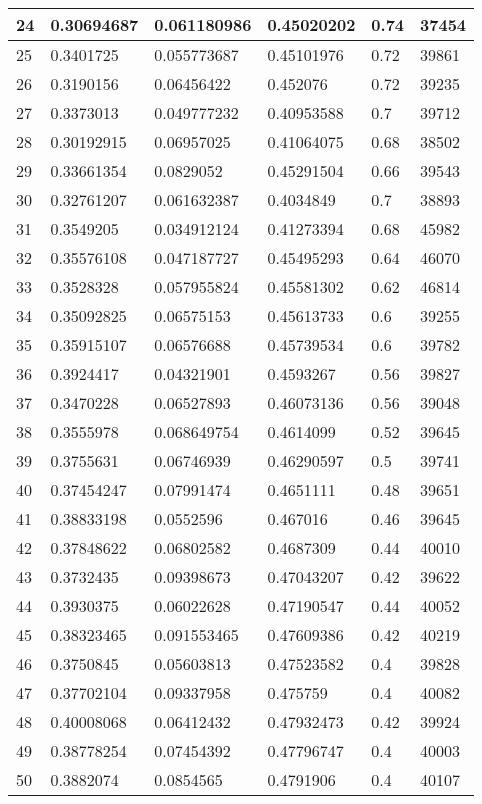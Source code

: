 \begin{longtable}{|l|l|l|l|l|l|}
24 & 0.30694687 & 0.061180986 & 0.45020202 & 0.74 & 37454 \\ \hline 
25 & 0.3401725 & 0.055773687 & 0.45101976 & 0.72 & 39861 \\ \hline 
26 & 0.3190156 & 0.06456422 & 0.452076 & 0.72 & 39235 \\ \hline 
27 & 0.3373013 & 0.049777232 & 0.40953588 & 0.7 & 39712 \\ \hline 
28 & 0.30192915 & 0.06957025 & 0.41064075 & 0.68 & 38502 \\ \hline 
29 & 0.33661354 & 0.0829052 & 0.45291504 & 0.66 & 39543 \\ \hline 
30 & 0.32761207 & 0.061632387 & 0.4034849 & 0.7 & 38893 \\ \hline 
31 & 0.3549205 & 0.034912124 & 0.41273394 & 0.68 & 45982 \\ \hline 
32 & 0.35576108 & 0.047187727 & 0.45495293 & 0.64 & 46070 \\ \hline 
33 & 0.3528328 & 0.057955824 & 0.45581302 & 0.62 & 46814 \\ \hline 
34 & 0.35092825 & 0.06575153 & 0.45613733 & 0.6 & 39255 \\ \hline 
35 & 0.35915107 & 0.06576688 & 0.45739534 & 0.6 & 39782 \\ \hline 
36 & 0.3924417 & 0.04321901 & 0.4593267 & 0.56 & 39827 \\ \hline 
37 & 0.3470228 & 0.06527893 & 0.46073136 & 0.56 & 39048 \\ \hline 
38 & 0.3555978 & 0.068649754 & 0.4614099 & 0.52 & 39645 \\ \hline 
39 & 0.3755631 & 0.06746939 & 0.46290597 & 0.5 & 39741 \\ \hline 
40 & 0.37454247 & 0.07991474 & 0.4651111 & 0.48 & 39651 \\ \hline 
41 & 0.38833198 & 0.0552596 & 0.467016 & 0.46 & 39645 \\ \hline 
42 & 0.37848622 & 0.06802582 & 0.4687309 & 0.44 & 40010 \\ \hline 
43 & 0.3732435 & 0.09398673 & 0.47043207 & 0.42 & 39622 \\ \hline 
44 & 0.3930375 & 0.06022628 & 0.47190547 & 0.44 & 40052 \\ \hline 
45 & 0.38323465 & 0.091553465 & 0.47609386 & 0.42 & 40219 \\ \hline 
46 & 0.3750845 & 0.05603813 & 0.47523582 & 0.4 & 39828 \\ \hline 
47 & 0.37702104 & 0.09337958 & 0.475759 & 0.4 & 40082 \\ \hline 
48 & 0.40008068 & 0.06412432 & 0.47932473 & 0.42 & 39924 \\ \hline 
49 & 0.38778254 & 0.07454392 & 0.47796747 & 0.4 & 40003 \\ \hline 
50 & 0.3882074 & 0.0854565 & 0.4791906 & 0.4 & 40107 \\ \hline 
\end{longtable}